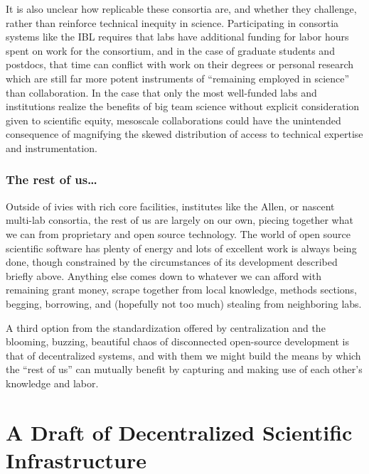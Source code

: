 \documentclass[10pt]{article}
\begin{document}
\begin{multicols}{2}
It is also unclear how replicable these consortia are, and whether they
challenge, rather than reinforce technical inequity in science.
Participating in consortia systems like the IBL requires that labs have
additional funding for labor hours spent on work for the consortium, and
in the case of graduate students and postdocs, that time can conflict
with work on their degrees or personal research which are still far more
potent instruments of ``remaining employed in science'' than
collaboration. In the case that only the most well-funded labs and
institutions realize the benefits of big team science without explicit
consideration given to scientific equity, mesoscale collaborations could
have the unintended consequence of magnifying the skewed distribution of
access to technical expertise and instrumentation.

\hypertarget{the-rest-of-us}{%
\subsubsection{The rest of us\ldots{}}\label{the-rest-of-us}}

Outside of ivies with rich core facilities, institutes like the Allen,
or nascent multi-lab consortia, the rest of us are largely on our own,
piecing together what we can from proprietary and open source
technology. The world of open source scientific software has plenty of
energy and lots of excellent work is always being done, though
constrained by the circumstances of its development described briefly
above. Anything else comes down to whatever we can afford with remaining
grant money, scrape together from local knowledge, methods sections,
begging, borrowing, and (hopefully not too much) stealing from
neighboring labs.

A third option from the standardization offered by centralization and
the blooming, buzzing, beautiful chaos of disconnected open-source
development is that of decentralized systems, and with them we might
build the means by which the ``rest of us'' can mutually benefit by
capturing and making use of each other's knowledge and labor.

\end{multicols}


\hypertarget{a-draft-of-decentralized-scientific-infrastructure}{%
\section{A Draft of Decentralized Scientific
Infrastructure}\label{a-draft-of-decentralized-scientific-infrastructure}}
\end{document}
